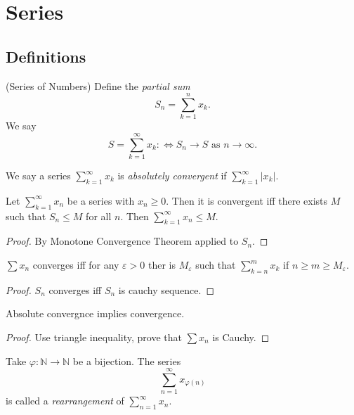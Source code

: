 
\section{Series}

\subsection{Definitions}

\begin{definition}(Series of Numbers)
	Define the \textit{partial sum} \[
		S_n = \sum_{k=1}^{n} x_k
	.\] 
	We say \[
		S = \sum_{k=1}^{\infty} x_k :\iff S_n \to S \text{ as } n\to \infty 
	.\] 
\end{definition}

\begin{definition}
	We say a series  $\sum_{k=1}^{\infty} x_k $ is \textit{absolutely convergent} if $\sum_{k=1}^{\infty} \left| x_k \right|  $.
\end{definition}

\begin{lemma}
	Let $\sum_{k=1}^{\infty} x_n$ be a series with $x_n \ge 0$. Then it is convergent iff there exists $M$ such that $S_n \le M$ for all $n$. Then $\sum_{k=1}^{\infty} x_n \le M$.
\end{lemma}
\begin{proof}
	By Monotone Convergence Theorem applied to $S_n$.
\end{proof}

\begin{lemma}
	$\sum x_n$ converges iff for any $\varepsilon>0$ ther is $M_\varepsilon$ such that $\sum_{k=n}^m x_k$ if $n\ge m\ge M_\varepsilon$.
\end{lemma}
\begin{proof}
	$S_n$ converges iff $S_n$ is cauchy sequence.
\end{proof}

\begin{proposition}
	Absolute convergnce implies convergence.
\end{proposition}
\begin{proof}
	Use triangle inequality, prove that $\sum x_n$ is Cauchy.
\end{proof}

\begin{definition}
	Take $\varphi: \mathbb{N}\to \mathbb{N}$ be a bijection. The series
	\[
		\sum_{n=1}^{\infty} x_{\varphi(n)}
	\] is called a \textit{rearrangement} of $\sum_{n=1}^{\infty} x_n $.
\end{definition}

